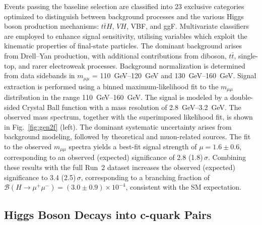 \documentclass[a4paper,11pt]{article}
\begin{document}
Events passing the baseline selection are classified into 23 exclusive
categories optimized to distinguish between background processes and
the various Higgs boson production mechanisms: $t\bar{t}H$, $VH$, VBF,
and ggF. Multivariate classifiers are employed to enhance signal
sensitivity, utilising variables which exploit the kinematic
properties of final-state particles.
%
The dominant background arises from Drell--Yan production, with
additional contributions from diboson, $t\bar{t}$, single-top, and
rarer electroweak processes. Background normalization is determined
from data sidebands in $m_{\mu\mu}$ =
\SIrange[range-phrase=~--~]{110}{120}{\giga\electronvolt} and
\SIrange[range-phrase=~--~]{130}{160}{\giga\electronvolt}. Signal extraction is
performed using a binned maximum-likelihood fit to the $m_{\mu\mu}$
distribution in the range
\SIrange[range-phrase=~--~]{110}{160}{\giga\electronvolt}. The signal is modeled by
a double-sided Crystal Ball function with a mass resolution of
\SIrange[range-phrase=~--~]{2.8}{3.2}{\giga\electronvolt}. The observed mass
spectrum, together with the superimposed likelihood fit, is shown in
Fig.~\ref{fig:gen2f} (left).
%
The dominant systematic uncertainty arises from background modeling,
followed by theoretical and muon-related sources. The fit to the
observed $m_{\mu\mu}$ spectra yields a best-fit signal strength of
$\mu = 1.6 \pm 0.6$, corresponding to an observed (expected)
significance of 2.8 (1.8)\,$\sigma$. Combining these results with the
full Run~2 dataset increases the observed (expected) significance to
3.4 (2.5)\,$\sigma$, corresponding to a branching fraction of $
\mathcal{B}(H \to \mu^+\mu^-) = (3.0 \pm 0.9) \times 10^{-4}$,
consistent with the SM expectation.

\subsection{Higgs Boson Decays into c-quark Pairs}
\end{document}
